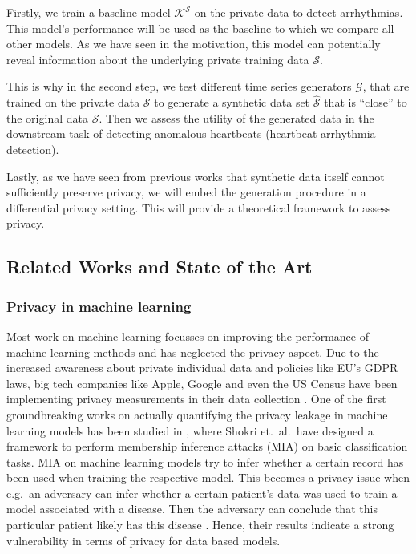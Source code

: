 Firstly, we train a baseline model \(\mathcal{K}^\mathcal{S}\) on the private data to detect arrhythmias. This model's performance will be used as the baseline to which we compare all other models. As we have seen in the motivation, this model can potentially reveal information about the underlying private training data $\mathcal{S}$.

This is why in the second step, we test different time series generators $\mathcal{G}$, that are trained on the private data $\mathcal{S}$ to generate a synthetic data set $\widehat{\mathcal{S}}$ that is ``close'' to the original data $\mathcal{S}$. Then we assess the utility of the generated data in the downstream task of detecting anomalous heartbeats (heartbeat arrhythmia detection). 

Lastly, as we have seen from previous works that synthetic data itself cannot sufficiently preserve privacy, we will embed the generation procedure in a differential privacy setting. This will provide a theoretical framework to assess privacy.

\subsection{Related Works and State of the Art}

\subsubsection*{Privacy in machine learning}
Most work on machine learning focusses on improving the performance of machine learning methods and has neglected the privacy aspect. Due to the increased awareness about private individual data and policies like EU's GDPR laws, big tech companies like Apple, Google and even the US Census have been implementing privacy measurements in their data collection \parencite[see][]{dwork2019differential,abowd2019census}. One of the first groundbreaking works on actually quantifying the privacy leakage in machine learning models has been studied in \parencite{shokri2017membership}, where Shokri et.\ al.\ have designed a framework to perform membership inference attacks (MIA) on basic classification tasks. MIA on machine learning models try to infer whether a certain record has been used when training the respective model. This becomes a privacy issue when e.g.\ an adversary can infer whether a certain patient's data was used to train a model associated with a disease. Then the adversary can conclude that this particular patient likely has this disease \parencite[cf.][p. 5]{shokri2017membership}. Hence, their results indicate a strong vulnerability in terms of privacy for data based models.


